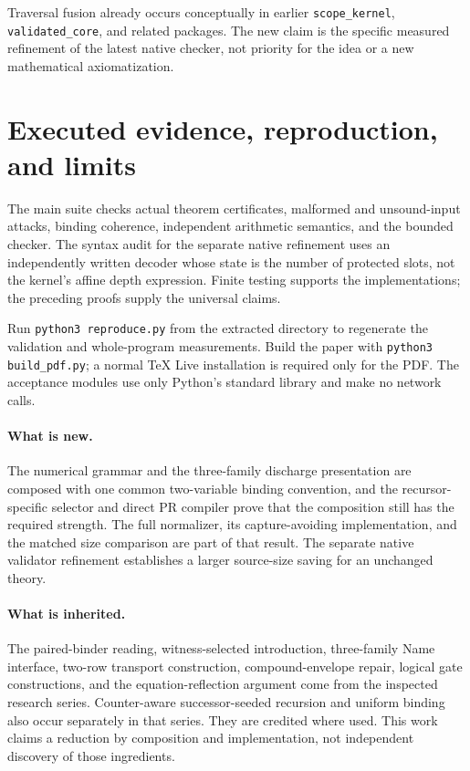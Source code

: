 \documentclass[11pt,letterpaper]{article}
\theoremstyle{definition}\newtheorem{definition}[theorem]{Definition}
\theoremstyle{remark}\newtheorem{remark}[theorem]{Remark}
\begin{document}
Traversal fusion already occurs conceptually in earlier
\texttt{scope\_kernel}, \texttt{validated\_core}, and related
packages. The new claim is the specific measured refinement
of the latest native checker, not priority for the idea or a
new mathematical axiomatization.

\section{Executed evidence, reproduction, and limits}\label{sec:validation}



The main suite checks actual theorem certificates, malformed and
unsound-input attacks, binding coherence, independent arithmetic
semantics, and the bounded checker. The syntax audit for the
separate native refinement uses an independently written decoder
whose state is the number of protected slots, not the kernel's
affine depth expression. Finite testing supports the implementations;
the preceding proofs supply the universal claims.

Run \texttt{python3 reproduce.py} from the extracted directory to
regenerate the validation and whole-program measurements. Build
the paper with \texttt{python3 build\_pdf.py}; a normal TeX Live
installation is required only for the PDF. The acceptance modules
use only Python's standard library and make no network calls.

\paragraph{What is new.}
The numerical grammar and the three-family discharge presentation
are composed with one common two-variable binding convention,
and the recursor-specific selector and direct PR compiler prove
that the composition still has the required strength. The full
normalizer, its capture-avoiding implementation, and the matched
size comparison are part of that result. The separate native
validator refinement establishes a larger source-size saving
for an unchanged theory.

\paragraph{What is inherited.}
The paired-binder reading, witness-selected introduction,
three-family Name interface, two-row transport construction,
compound-envelope repair, logical gate constructions, and the
equation-reflection argument come from the inspected research
series. Counter-aware successor-seeded recursion and uniform
binding also occur separately in that series. They are credited
where used. This work claims a reduction by composition and
implementation, not independent discovery of those ingredients.
\end{document}
